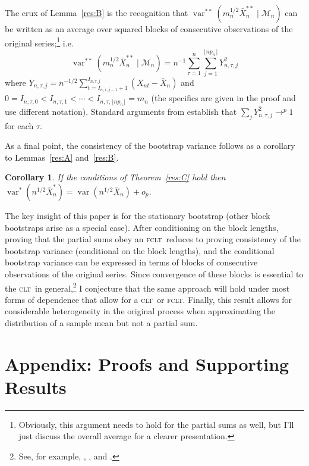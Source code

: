 \documentclass[12pt]{article}
\newtheorem{cor}[thm]{Corollary}
\theoremstyle{definition}
\DeclareMathOperator{\var}{var}
\newcommand{\clt}{\textsc{clt}}
\newcommand{\fclt}{\textsc{fclt}}
\begin{document}
The crux of Lemma~\ref{res:B} is the recognition that
$\var^{**}(m_n^{1/2} \bar{X}_n^{**} \mid \mathcal{M}_n)$ can be written as an
average over squared blocks of consecutive observations of the
original series;\footnote{Obviously, this argument needs to hold for
  the partial sums as well, but I'll just discuss the overall average
  for a clearer presentation.} i.e.
\begin{equation}
  \var^{**}(m_n^{1/2} \bar{X}^{**}_n \mid \mathcal{M}_n) = n^{-1}
  \sum_{\tau=1}^n \sum_{j=1}^{\lfloor n p_n \rfloor} Y_{n, \tau, j}^2
\end{equation}
where $Y_{n, \tau, j} = n^{-1/2}\sum_{t=I_{n,\tau,j-1}+1}^{I_{n,\tau,j}}
(X_{nt} - \bar{X}_n)$ and $0 = I_{n,\tau,0} < I_{n,\tau,1} < \cdots <
I_{n,\tau,\lfloor n p_n \rfloor} = m_n$ (the specifics are given in the
proof and use different notation).  Standard arguments from
\citet{Jon:97} establish that $\sum_j Y_{n,\tau,j}^2 \to^p 1$ for each
$\tau$.

As a final point, the consistency of the bootstrap variance 
follows as a corollary to Lemmas~\ref{res:A} and~\ref{res:B}.

\begin{cor}\label{res:D}
  If the conditions of Theorem~\ref{res:C} hold then
  $\var^{*}(n^{1/2} \bar{X}_n^{*}) = \var(n^{1/2} \bar{X}_n) + o_p$.
\end{cor}

The key insight of this paper is for the stationary bootstrap (other
block bootstraps arise as a special case).  After conditioning on the
block lengths, proving that the partial sums obey an \fclt\ reduces to
proving consistency of the bootstrap variance (conditional on the
block lengths), and the conditional bootstrap variance can be
expressed in terms of blocks of consecutive observations of the
original series.  Since convergence of these blocks is essential to
the \clt\ in general,\footnote{See, for example, \citet{Mcl:74},
  \citet[Chapter 3]{HaH:80}, and \citet[Chapter 24]{Dav:94}.} I
conjecture that the same approach will hold under most forms of
dependence that allow for a \clt\ or \fclt.  Finally, this result
allows for considerable heterogeneity in the original process when
approximating the distribution of a sample mean but not a partial sum.

\appendix

\section*{Appendix: Proofs and Supporting Results}
\setcounter{section}{1}
\end{document}
